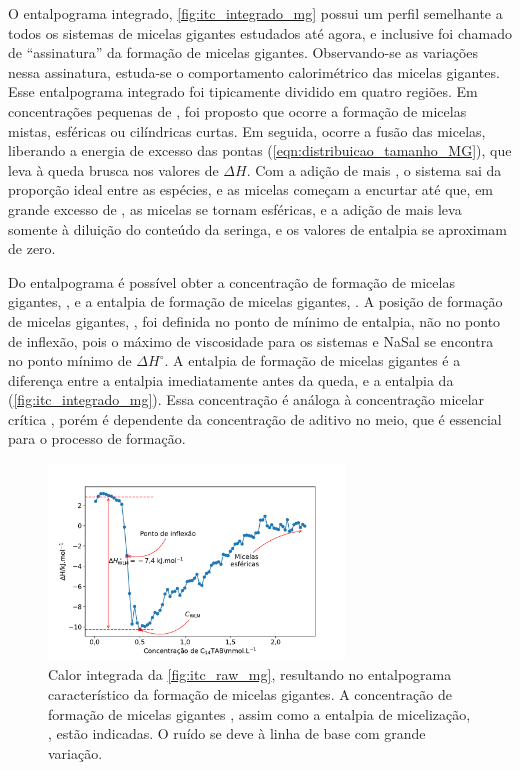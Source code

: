 		O entalpograma integrado, \autoref{fig:itc_integrado_mg} possui um perfil semelhante a todos os sistemas de micelas gigantes estudados até agora, e inclusive foi chamado de ``assinatura'' da formação de micelas gigantes. Observando-se as variações nessa assinatura, estuda-se o comportamento calorimétrico das micelas gigantes. \cite{Ito2016} 
		Esse entalpograma integrado foi tipicamente dividido em quatro regiões. Em concentrações pequenas de \TTAB, foi proposto que ocorre a formação de micelas mistas, esféricas ou cilíndricas curtas. Em seguida, ocorre a fusão das micelas, liberando a energia de excesso das pontas (\autoref{eqn:distribuicao_tamanho_MG}), que leva à queda brusca nos valores de \(\Delta H\). Com a adição de mais \TTAB, o sistema sai da proporção ideal entre as espécies, e as micelas começam a encurtar até que, em grande excesso de \TTAB, as micelas se tornam esféricas, e a adição de mais \TTAB{} leva somente à diluição do conteúdo da seringa, e os valores de entalpia se aproximam de zero.\cite{Shukla2008, Ito2015c}
		
		Do entalpograma é possível obter a concentração de formação de micelas gigantes, \cwlm, e a entalpia de formação de micelas gigantes, \DHwlm. A posição de formação de micelas gigantes, \cwlm, foi definida no ponto de mínimo de entalpia, não no ponto de inflexão, pois o máximo de viscosidade para os sistemas \TTAB{} e NaSal se encontra no ponto mínimo de \(\Delta H^\circ\). \cite{Ito2015c} A entalpia de formação de micelas gigantes \DHwlm{} é a diferença entre a entalpia imediatamente antes da queda, e a entalpia da \cwlm (\autoref{fig:itc_integrado_mg}). Essa concentração é análoga à concentração micelar crítica \cmc, porém é dependente da concentração de aditivo no meio, que é essencial para o processo de formação.

		
		\begin{figure}[h]
			\centering
			\includegraphics[width=0.7\textwidth]{imagens/itc/exemplo_integrado_mg}
			\caption{Calor integrada da \autoref{fig:itc_raw_mg}, resultando no entalpograma característico da formação de micelas gigantes. A concentração de formação de micelas gigantes \cwlm, assim como a entalpia de micelização, \DHwlm, estão indicadas. O ruído se deve à linha de base com grande variação.}
			\label{fig:itc_integrado_mg}
		\end{figure}
		
